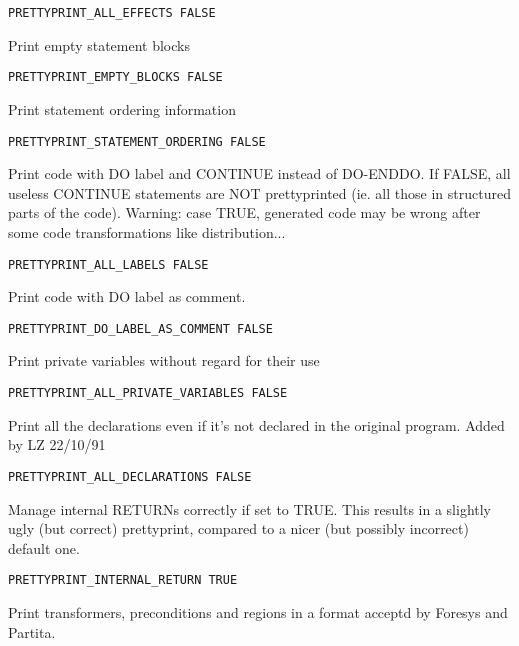 \begin{verbatim}
PRETTYPRINT_ALL_EFFECTS FALSE
\end{verbatim}

Print empty statement blocks

\begin{verbatim}
PRETTYPRINT_EMPTY_BLOCKS FALSE
\end{verbatim}

Print statement ordering information

\begin{verbatim}
PRETTYPRINT_STATEMENT_ORDERING FALSE
\end{verbatim}

Print code with DO label and CONTINUE instead of DO-ENDDO. If FALSE, all
useless CONTINUE statements are NOT prettyprinted (ie. all those in
structured parts of the code). Warning: case TRUE, generated code may be
wrong after some code transformations like distribution...

\begin{verbatim}
PRETTYPRINT_ALL_LABELS FALSE
\end{verbatim}

Print code with DO label as comment.

\begin{verbatim}
PRETTYPRINT_DO_LABEL_AS_COMMENT FALSE
\end{verbatim}

Print private variables without regard for their use

\begin{verbatim}
PRETTYPRINT_ALL_PRIVATE_VARIABLES FALSE
\end{verbatim}


Print all the declarations even if it's not declared in the original program.
Added by LZ 22/10/91

\begin{verbatim}
PRETTYPRINT_ALL_DECLARATIONS FALSE
\end{verbatim}

Manage internal RETURNs correctly if set to TRUE.  This results in a
slightly ugly (but correct) prettyprint, compared to a nicer (but
possibly incorrect) default one.

\begin{verbatim}
PRETTYPRINT_INTERNAL_RETURN TRUE
\end{verbatim}

Print transformers, preconditions and regions in a format acceptd by Foresys and
Partita. 

